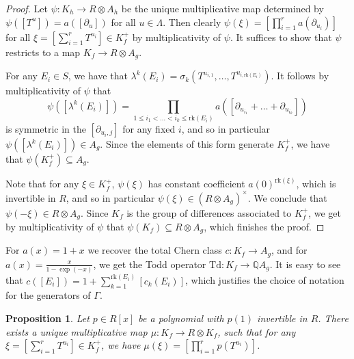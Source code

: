 \documentclass[oneside]{amsart}
\theoremstyle{plain}
\newtheorem{proposition}[theorem]{Proposition}
\theoremstyle{definition}
\newcommand{\Q}{{\mathbb{Q}}}
\newcommand{\rk}{{\mathrm{rk}}}
\newcommand{\Td}{{\mathrm{Td}}}
\begin{document}
\begin{proof}
    Let $\psi: K_h \to R\otimes A_h$ be the unique multiplicative map determined by
    $\psi([T^u]) = a([\partial_u])$ for all $u \in \Lambda$. Then clearly $\psi(\xi) = \left[\prod_{i = 1}^r a(\partial_{u_i})\right]$ for all $\xi = \left[ \sum_{i = 1}^r T^{u_i} \right] \in K_f^+$ by multiplicativity of $\psi$. It suffices to show that $\psi$ restricts to a map $K_f \to R \otimes A_g$.
    
    For any $E_i \in S$, we have that $\lambda^k(E_i) = \sigma_k(T^{u_{i, 1}}, \dots, T^{u_{i, \rk(E_i)}})$. It follows by multiplicativity of $\psi$ that
    \[
    \psi([\lambda^k(E_i)]) = \prod_{1 \leq i_1 < \dots < i_k \leq \rk(E_i)}a([\partial_{u_{i_1}} + \dots + \partial_{u_{i_k}}])
    \]
    is symmetric in the $[\partial_{u_{i}, j}]$ for any fixed $i$, and so in particular $\psi([\lambda^k(E_i)]) \in A_g$. Since the elements of this form generate $K_f^+$, we have that
    $\psi(K_f^+) \subseteq A_g$.

    Note that for any $\xi \in K_f^+$, $\psi(\xi)$ has constant coefficient $a(0)^{\rk(\xi)}$, which is invertible in $R$, and so in particular $\psi(\xi) \in (R \otimes A_g)^\times$. We conclude that $\psi(-\xi) \in R \otimes A_g$. Since $K_f$ is the group of differences associated to $K_f^+$, we get by multiplicativity of $\psi$
    that $\psi(K_f) \subseteq R \otimes A_g$, which finishes the proof.
\end{proof}

For $a(x) = 1 + x$ we recover the total Chern class
$c: K_f \to A_g$, and for $a(x) = \frac{x}{1 - \exp(-x)}$, we get the Todd operator $\Td: K_f \to \Q A_g$.
It is easy to see that $c([E_i]) = 1 + \sum_{k = 1}^{\rk(E_i)}[c_k(E_i)]$, which justifies the choice of notation for the generators of $\Gamma$.

\begin{proposition}
    \label{prop:mult-map-Kf-general}
    Let $p \in R[x]$ be a polynomial with $p(1)$ invertible in $R$. There exists a unique multiplicative map
    $\mu: K_f \to R \otimes K_f$, such that for any $\xi = \left[\sum_{i = 1}^r T^{u_i}\right] \in K_f^+$, we have
    $\mu(\xi) = \left[ \prod_{i = 1}^{r}p(T^{u_{i}}) \right]$.
\end{proposition}
\end{document}
